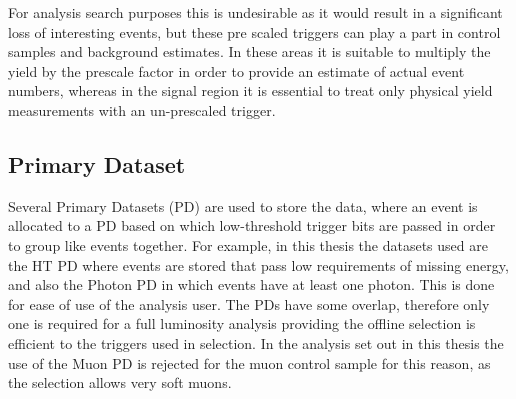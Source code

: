 For analysis search purposes this is undesirable as it would result in a significant loss of interesting events, but these pre scaled triggers can play a part in control samples and background estimates. In these areas it is suitable to multiply the yield by the prescale factor in order to provide an estimate of actual event numbers, whereas in the signal region it is essential to treat only physical yield measurements with an un-prescaled trigger.
\subsection{Primary Dataset}
Several Primary Datasets (PD) are used to store the data, where an event is allocated to a PD based on which low-threshold trigger bits are passed in order to group like events together. For example, in this thesis the datasets used are the HT PD where events are stored that pass low requirements of missing energy, and also the Photon PD in which events have at least one photon. This is done for ease of use of the analysis user. The PDs have some overlap, therefore only one is required for a full luminosity analysis providing the offline selection is efficient to the triggers used in selection. In the analysis set out in this thesis the use of the Muon PD is rejected for the muon control sample for this reason, as the selection allows very soft muons. 


